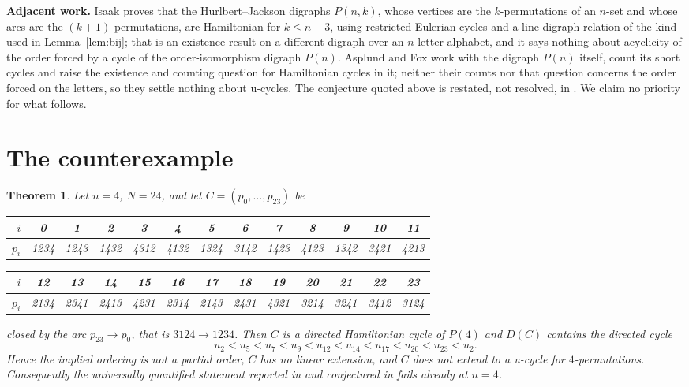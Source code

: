 \documentclass[11pt]{amsart}
\newtheorem{theorem}{Theorem}
\begin{document}
\medskip\noindent\textbf{Adjacent work.} Isaak \cite{Isaak2006} proves that the
Hurlbert--Jackson digraphs $P(n,k)$, whose vertices are the $k$-permutations of
an $n$-set and whose arcs are the $(k+1)$-permutations, are Hamiltonian for
$k\le n-3$, using restricted Eulerian cycles and a line-digraph relation of the
kind used in Lemma~\ref{lem:bij}; that is an existence result on a different
digraph over an $n$-letter alphabet, and it says nothing about acyclicity of the
order forced by a cycle of the order-isomorphism digraph $P(n)$. Asplund and Fox
\cite{AsplundFox} work with the digraph $P(n)$ itself, count its short cycles
and raise the existence and counting question for Hamiltonian cycles in it;
neither their counts nor that question concerns the order forced on the letters,
so they settle nothing about u-cycles. The conjecture quoted above is restated,
not resolved, in \cite{KQ2026}. We claim no priority for what follows.

\section{The counterexample}

\begin{theorem}\label{thm:main}
Let $n=4$, $N=24$, and let $C=(p_0,\dots,p_{23})$ be
\begin{center}\footnotesize
\begin{tabular}{r|cccccccccccc}
$i$   & 0&1&2&3&4&5&6&7&8&9&10&11\\\hline
$p_i$ & 1234&1243&1432&4312&4132&1324&3142&1423&4123&1342&3421&4213
\end{tabular}

\medskip
\begin{tabular}{r|cccccccccccc}
$i$   & 12&13&14&15&16&17&18&19&20&21&22&23\\\hline
$p_i$ & 2134&2341&2413&4231&2314&2143&2431&4321&3214&3241&3412&3124
\end{tabular}
\end{center}
closed by the arc $p_{23}\to p_0$, that is $3124\to1234$. Then $C$ is a
directed Hamiltonian cycle of $P(4)$ and $D(C)$ contains the directed cycle
\begin{equation}\label{eq:chain}
 u_2<u_5<u_7<u_9<u_{12}<u_{14}<u_{17}<u_{20}<u_{23}<u_2 .
\end{equation}
Hence the implied ordering is not a partial order, $C$ has no linear extension,
and $C$ does not extend to a u-cycle for $4$-permutations. Consequently the
universally quantified statement reported in \cite{KQ2024} and conjectured in
\cite{KQ2026} fails already at $n=4$.
\end{theorem}
\end{document}
